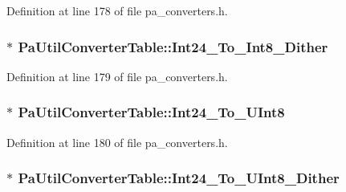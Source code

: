 Definition at line 178 of file pa\+\_\+converters.\+h.

\subsubsection[{\texorpdfstring{Int24\+\_\+\+To\+\_\+\+Int8\+\_\+\+Dither}{Int24_To_Int8_Dither}}]{$\ast$ Pa\+Util\+Converter\+Table\+::\+Int24\+\_\+\+To\+\_\+\+Int8\+\_\+\+Dither}\hypertarget{struct_pa_util_converter_table_af3a9b0e8c0eb34bceccea89dcfb865fc}{}\label{struct_pa_util_converter_table_af3a9b0e8c0eb34bceccea89dcfb865fc}


Definition at line 179 of file pa\+\_\+converters.\+h.

\subsubsection[{\texorpdfstring{Int24\+\_\+\+To\+\_\+\+U\+Int8}{Int24_To_UInt8}}]{$\ast$ Pa\+Util\+Converter\+Table\+::\+Int24\+\_\+\+To\+\_\+\+U\+Int8}\hypertarget{struct_pa_util_converter_table_a9591a7dd771f729ad3909d95b6ee66ef}{}\label{struct_pa_util_converter_table_a9591a7dd771f729ad3909d95b6ee66ef}


Definition at line 180 of file pa\+\_\+converters.\+h.

\subsubsection[{\texorpdfstring{Int24\+\_\+\+To\+\_\+\+U\+Int8\+\_\+\+Dither}{Int24_To_UInt8_Dither}}]{$\ast$ Pa\+Util\+Converter\+Table\+::\+Int24\+\_\+\+To\+\_\+\+U\+Int8\+\_\+\+Dither}\hypertarget{struct_pa_util_converter_table_ade2bc8ee129fda10efcfb14861559f5c}{}\label{struct_pa_util_converter_table_ade2bc8ee129fda10efcfb14861559f5c}


